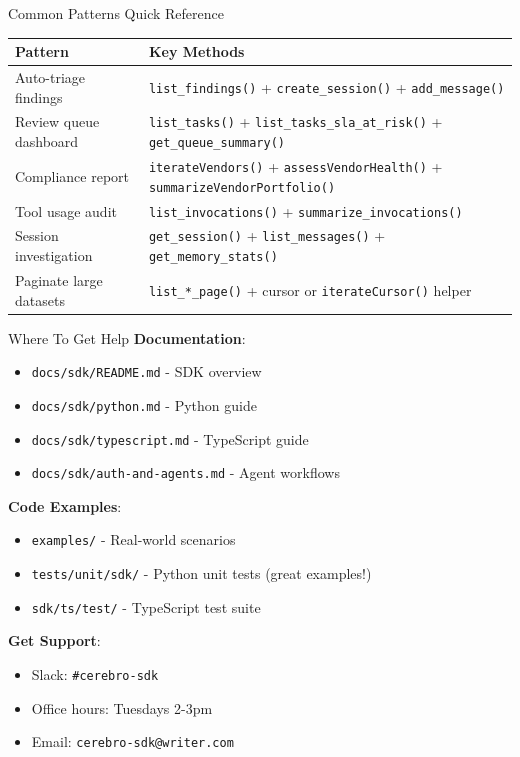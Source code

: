 \documentclass[aspectratio=169]{beamer}
\begin{document}
\begin{frame}{Common Patterns Quick Reference}
\begin{tabular}{p{}p{}}
\toprule
\textbf{Pattern} & \textbf{Key Methods} \\
\midrule
Auto-triage findings & \texttt{list\_findings()} + \texttt{create\_session()} + \texttt{add\_message()} \\
\midrule
Review queue dashboard & \texttt{list\_tasks()} + \texttt{list\_tasks\_sla\_at\_risk()} + \texttt{get\_queue\_summary()} \\
\midrule
Compliance report & \texttt{iterateVendors()} + \texttt{assessVendorHealth()} + \texttt{summarizeVendorPortfolio()} \\
\midrule
Tool usage audit & \texttt{list\_invocations()} + \texttt{summarize\_invocations()} \\
\midrule
Session investigation & \texttt{get\_session()} + \texttt{list\_messages()} + \texttt{get\_memory\_stats()} \\
\midrule
Paginate large datasets & \texttt{list\_*\_page()} + cursor or \texttt{iterateCursor()} helper \\
\bottomrule
\end{tabular}
\end{frame}

\begin{frame}{Where To Get Help}
\textbf{Documentation}:
\begin{itemize}
  \item \texttt{docs/sdk/README.md} - SDK overview
  \item \texttt{docs/sdk/python.md} - Python guide
  \item \texttt{docs/sdk/typescript.md} - TypeScript guide
  \item \texttt{docs/sdk/auth-and-agents.md} - Agent workflows
\end{itemize}

\vspace{0.3cm}

\textbf{Code Examples}:
\begin{itemize}
  \item \texttt{examples/} - Real-world scenarios
  \item \texttt{tests/unit/sdk/} - Python unit tests (great examples!)
  \item \texttt{sdk/ts/test/} - TypeScript test suite
\end{itemize}

\vspace{0.3cm}

\textbf{Get Support}:
\begin{itemize}
  \item Slack: \texttt{\#cerebro-sdk}
  \item Office hours: Tuesdays 2-3pm
  \item Email: \texttt{cerebro-sdk@writer.com}
\end{itemize}
\end{frame}
\end{document}
